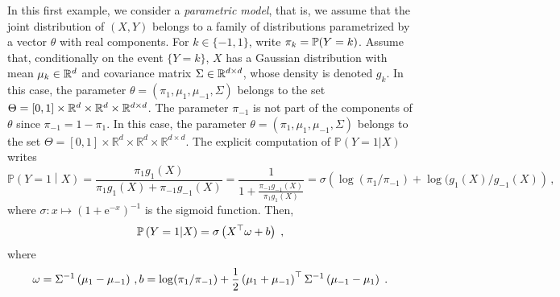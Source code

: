 







In this first example, we consider a {\em parametric model}, that is, we assume that the joint distribution of $(X,Y)$ belongs to a family of distributions parametrized by a vector $\theta$ with real components. For $k\in\{-1,1\}$, write $\pi_k = \mathbb{P}(Y = k)$. Assume that, conditionally on the event $\{Y = k\}$, $X$ has a Gaussian distribution with mean $\mu_k \in\mathbb{R}^d$ and covariance matrix $\Sigma\in \mathbb{R}^{d\times d}$, whose density is denoted $g_k$. In this case, the parameter $\theta=(\pi_1, \mu_1,\mu_{-1}, \Sigma)$ belongs to the set $\Theta= [0,1] \times \mathbb{R}^d \times \mathbb{R}^d \times \mathbb{R}^{d \times d}$. The parameter $\pi_{-1}$ is not part of the components of $\theta$ since $\pi_{-1}=1-\pi_{1}$. In this case, the parameter $\theta=(\pi_1, \mu_1,\mu_{-1}, \Sigma)$ belongs to the set $\Theta= [0,1] \times \mathbb{R}^d \times \mathbb{R}^d \times \mathbb{R}^{d \times d}$. The explicit computation of $\mathbb{P}(Y=1 | X)$ writes
$$
\mathbb{P}\left(Y=1\middle | X\right) = \frac{\pi_1g_1(X)}{\pi_1g_1(X) + \pi_{-1}g_{-1}(X)} = \frac{1}{1 + \frac{\pi_{-1}g_{-1}(X)}{\pi_1g_1(X)}} = \sigma\left(\log(\pi_1/\pi_{-1}) + \log(g_1(X)/g_{-1}(X)\right)\,,
$$
where $\sigma: x\mapsto (1 + \mathrm{e}^{-x})^{-1}$ is the sigmoid function. Then,
\begin{equation}
\label{eq:prob:lda}
\mathbb{P}\left(Y=1\middle | X\right) = \sigma\left( X^\top\omega+ b\right)\;,
\end{equation}
where
$$
\omega =  \Sigma^{-1}\left(\mu_{1} - \mu_{-1}\right)\,,
b = \log(\pi_1/\pi_{-1}) +  \frac{1}{2}\left(\mu_{1}+\mu_{-1}\right)^\top\Sigma^{-1}\left(\mu_{-1}-\mu_{1}\right)\;.
$$

